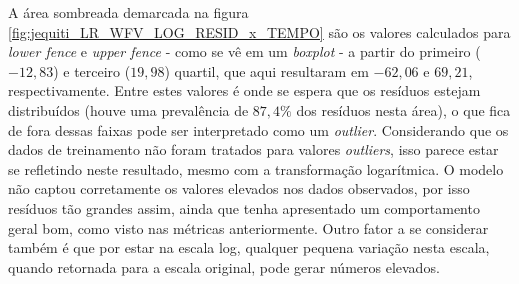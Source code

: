 %

A área sombreada demarcada na figura \ref{fig:jequiti_LR_WFV_LOG_RESID_x_TEMPO} são os valores calculados para \textit{lower fence} e \textit{upper fence} - como se vê em um \textit{boxplot} - a partir do primeiro ($-12,83$) e terceiro ($19,98$) quartil, que aqui resultaram em $-62,06$ e $69,21$, respectivamente. Entre estes valores é onde se espera que os resíduos estejam distribuídos (houve uma prevalência de $87,4\%$ dos resíduos nesta área), o que fica de fora dessas faixas pode ser interpretado como um \textit{outlier}. Considerando que os dados de treinamento não foram tratados para valores \textit{outliers}, isso parece estar se refletindo neste resultado, mesmo com a transformação logarítmica. O modelo não captou corretamente os valores elevados nos dados observados, por isso resíduos tão grandes assim, ainda que tenha apresentado um comportamento geral bom, como visto nas métricas anteriormente. Outro fator a se considerar também é que por estar na escala log, qualquer pequena variação nesta escala, quando retornada para a escala original, pode gerar números elevados.

